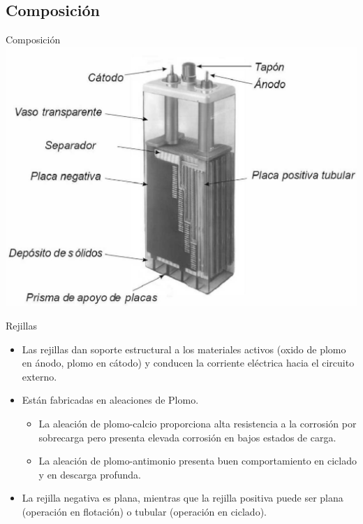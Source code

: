 \documentclass[xcolor={usenames,svgnames,dvipsnames}]{beamer}
\begin{document}
\subsection{Composición}
\label{sec-2-5}

\begin{frame}[label=sec-2-5-1]{Composición}
\includegraphics[width=.9\linewidth]{../figs/AcumuladorBN.pdf}
\end{frame}

\begin{frame}[label=sec-2-5-2]{Rejillas}
\begin{itemize}
\item Las rejillas dan \alert{soporte estructural a los materiales activos} (oxido de plomo en ánodo, plomo en cátodo) y \alert{conducen la corriente
eléctrica} hacia el circuito externo.

\item Están fabricadas en \alert{aleaciones de Plomo}.

\begin{itemize}
\item La \alert{aleación de plomo-calcio} proporciona alta resistencia a la corrosión por sobrecarga pero presenta elevada corrosión en bajos
estados de carga.

\item La \alert{aleación de plomo-antimonio} presenta buen comportamiento en ciclado y en descarga profunda.
\end{itemize}

\item \alert{La rejilla negativa es plana}, mientras que la \alert{rejilla positiva puede ser plana} (operación en flotación) \alert{o tubular} (operación en
ciclado).
\end{itemize}
\end{frame}
\end{document}

